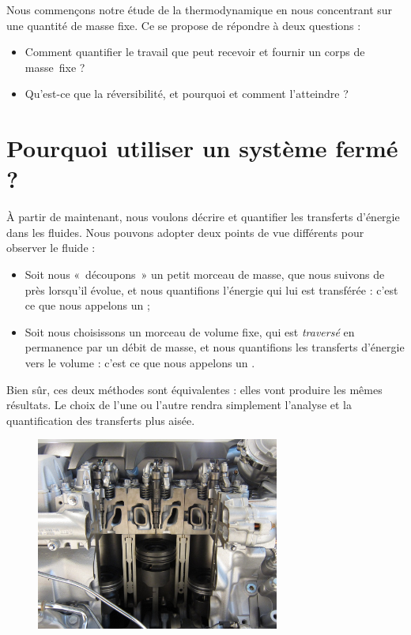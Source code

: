 
	Nous commençons notre étude de la thermodynamique en nous concentrant sur une quantité de masse fixe. Ce \coursdeux se propose de répondre à deux questions :
	\begin{itemize}
		\item Comment quantifier le travail que peut recevoir et fournir un corps de masse~fixe ?
		\item Qu’est-ce que la réversibilité, et pourquoi et comment l’atteindre ?
	\end{itemize}\dontbreakpage \vspace{2em}


\section{Pourquoi utiliser un système fermé ?}

		À partir de maintenant, nous voulons décrire et quantifier les transferts d’énergie dans les fluides. Nous pouvons adopter deux points de vue différents pour observer le fluide :
		\begin{itemize}
			\item Soit nous «~découpons~» un petit morceau de masse, que nous suivons de près lorsqu’il évolue, et nous quantifions l’énergie qui lui est transférée : c’est ce que nous appelons un  ;
			\item Soit nous choisissons un morceau de volume fixe, qui est \emph{traversé} en permanence par un débit de masse, et nous quantifions les transferts d’énergie vers le volume : c’est ce que nous appelons un .
		\end{itemize}
		
		Bien sûr, ces deux méthodes sont équivalentes : elles vont produire les mêmes résultats. Le choix de l’une ou l’autre rendra simplement l’analyse et la quantification des transferts plus aisée.

		\begin{figure}
			\begin{center}
			\includegraphics[width=8cm]{images/diesel_engine_cutaway.jpg}
			\end{center}
				{ \ccbysa \olivier}
				\label{fig_diesel_engine_cutaway}
		\end{figure}
		
